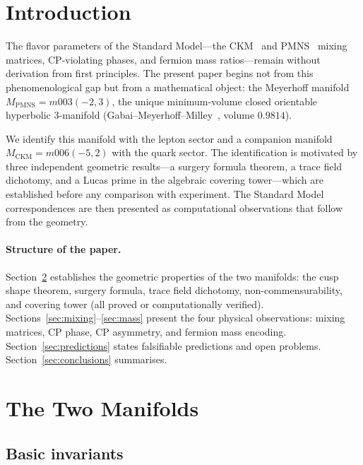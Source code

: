 \documentclass[11pt,a4paper]{article}
\theoremstyle{definition}
\theoremstyle{remark}
\newcommand{\MPMNS}{M_{\mathrm{PMNS}}}
\newcommand{\MCKM}{M_{\mathrm{CKM}}}
\begin{document}
\tableofcontents

\section{Introduction}
\label{sec:intro}

The flavor parameters of the Standard Model---the
CKM~\cite{Kobayashi} and PMNS~\cite{Maki} mixing matrices,
CP-violating phases, and fermion mass ratios---remain without
derivation from first principles.
The present paper begins not from this phenomenological gap
but from a mathematical object: the Meyerhoff manifold
$\MPMNS = m003(-2,3)$, the unique minimum-volume closed
orientable hyperbolic 3-manifold (Gabai--Meyerhoff--Milley~\cite{GMM},
volume $0.9814$).

We identify this manifold with the lepton sector and a
companion manifold $\MCKM = m006(-5,2)$ with the quark sector.
The identification is motivated by three independent geometric
results---a surgery formula theorem, a trace field dichotomy,
and a Lucas prime in the algebraic covering tower---which are
established before any comparison with experiment.
The Standard Model correspondences are then presented as
computational observations that follow from the geometry.

\paragraph{Structure of the paper.}
Section~\ref{sec:manifolds} establishes the geometric
properties of the two manifolds: the cusp shape theorem,
surgery formula, trace field dichotomy, non-commensurability,
and covering tower (all proved or computationally verified).
Sections~\ref{sec:mixing}--\ref{sec:mass} present the
four physical observations: mixing matrices, CP phase,
CP asymmetry, and fermion mass encoding.
Section~\ref{sec:predictions} states falsifiable predictions
and open problems.
Section~\ref{sec:conclusions} summarises.

\section{The Two Manifolds}
\label{sec:manifolds}

\subsection{Basic invariants}
\end{document}
